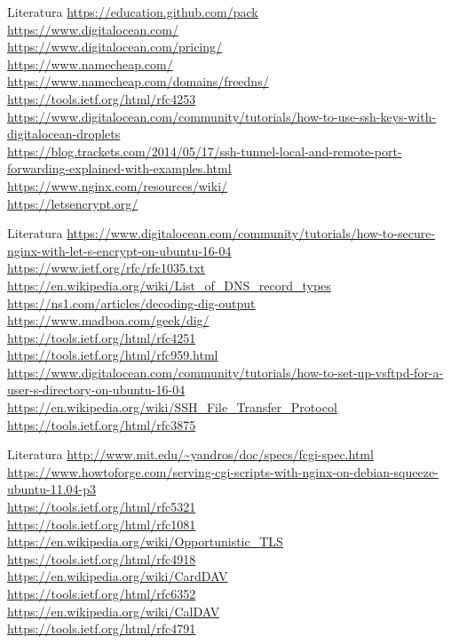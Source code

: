 \documentclass[t]{beamer}
\begin{document}
\begin{frame}{Literatura}
\url{https://education.github.com/pack}\\
\url{https://www.digitalocean.com/}\\
\url{https://www.digitalocean.com/pricing/}\\
\url{https://www.namecheap.com/}\\
\url{https://www.namecheap.com/domains/freedns/}\\
\url{https://tools.ietf.org/html/rfc4253}\\
\url{https://www.digitalocean.com/community/tutorials/how-to-use-ssh-keys-with-digitalocean-droplets}\\
\url{https://blog.trackets.com/2014/05/17/ssh-tunnel-local-and-remote-port-forwarding-explained-with-examples.html}\\
\url{https://www.nginx.com/resources/wiki/}\\
\url{https://letsencrypt.org/}\\
\end{frame}

\begin{frame}{Literatura}
\url{https://www.digitalocean.com/community/tutorials/how-to-secure-nginx-with-let-s-encrypt-on-ubuntu-16-04}\\
\url{https://www.ietf.org/rfc/rfc1035.txt}\\
\url{https://en.wikipedia.org/wiki/List_of_DNS_record_types}\\
\url{https://ns1.com/articles/decoding-dig-output}\\
\url{https://www.madboa.com/geek/dig/}\\
\url{https://tools.ietf.org/html/rfc4251}\\
\url{https://tools.ietf.org/html/rfc959.html}\\
\url{https://www.digitalocean.com/community/tutorials/how-to-set-up-vsftpd-for-a-user-s-directory-on-ubuntu-16-04}\\
\url{https://en.wikipedia.org/wiki/SSH_File_Transfer_Protocol}\\
\url{https://tools.ietf.org/html/rfc3875}\\
\end{frame}

\begin{frame}{Literatura}
\url{http://www.mit.edu/~yandros/doc/specs/fcgi-spec.html}\\
\url{https://www.howtoforge.com/serving-cgi-scripts-with-nginx-on-debian-squeeze-ubuntu-11.04-p3}\\
\url{https://tools.ietf.org/html/rfc5321}\\
\url{https://tools.ietf.org/html/rfc1081}\\
\url{https://en.wikipedia.org/wiki/Opportunistic_TLS}\\
\url{https://tools.ietf.org/html/rfc4918}\\
\url{https://en.wikipedia.org/wiki/CardDAV}\\
\url{https://tools.ietf.org/html/rfc6352}\\
\url{https://en.wikipedia.org/wiki/CalDAV}\\
\url{https://tools.ietf.org/html/rfc4791}\\
\end{frame}
\end{document}
